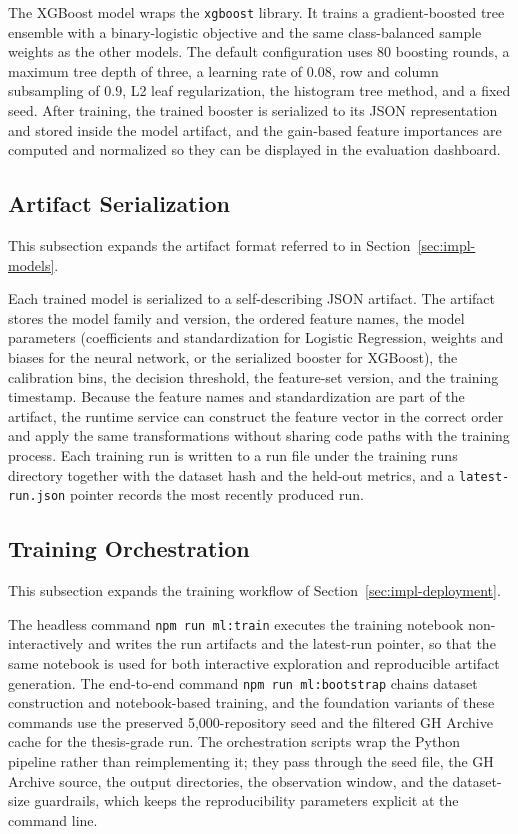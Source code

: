 The XGBoost model wraps the \texttt{xgboost} library. It trains a gradient-boosted tree ensemble with a binary-logistic objective and the same class-balanced sample weights as the other models. The default configuration uses 80 boosting rounds, a maximum tree depth of three, a learning rate of \(0.08\), row and column subsampling of \(0.9\), L2 leaf regularization, the histogram tree method, and a fixed seed. After training, the trained booster is serialized to its JSON representation and stored inside the model artifact, and the gain-based feature importances are computed and normalized so they can be displayed in the evaluation dashboard.

\subsection{Artifact Serialization}
\label{sec:impl-artifacts}

This subsection expands the artifact format referred to in Section~\ref{sec:impl-models}.

Each trained model is serialized to a self-describing JSON artifact. The artifact stores the model family and version, the ordered feature names, the model parameters (coefficients and standardization for Logistic Regression, weights and biases for the neural network, or the serialized booster for XGBoost), the calibration bins, the decision threshold, the feature-set version, and the training timestamp. Because the feature names and standardization are part of the artifact, the runtime service can construct the feature vector in the correct order and apply the same transformations without sharing code paths with the training process. Each training run is written to a run file under the training runs directory together with the dataset hash and the held-out metrics, and a \texttt{latest-run.json} pointer records the most recently produced run.

\subsection{Training Orchestration}
\label{sec:impl-training-orchestration}

This subsection expands the training workflow of Section~\ref{sec:impl-deployment}.

The headless command \texttt{npm run ml:train} executes the training notebook non-interactively and writes the run artifacts and the latest-run pointer, so that the same notebook is used for both interactive exploration and reproducible artifact generation. The end-to-end command \texttt{npm run ml:bootstrap} chains dataset construction and notebook-based training, and the foundation variants of these commands use the preserved 5{,}000-repository seed and the filtered GH Archive cache for the thesis-grade run. The orchestration scripts wrap the Python pipeline rather than reimplementing it; they pass through the seed file, the GH Archive source, the output directories, the observation window, and the dataset-size guardrails, which keeps the reproducibility parameters explicit at the command line.

